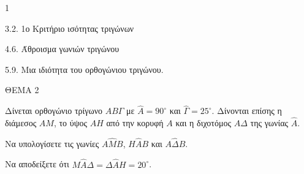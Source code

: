 \begin{ylh}{1}
    \item 3.2. 1ο Κριτήριο ισότητας τριγώνων
    \item 4.6. Άθροισμα γωνιών τριγώνου
    \item 5.9. Μια ιδιότητα του ορθογώνιου τριγώνου.
\end{ylh}

ΘΕΜΑ 2

Δίνεται ορθογώνιο τρίγωνο $AB\Gamma$ με $\widehat{A} = 90^{\circ}$ και $\widehat{\Gamma} = 25^{\circ}$. Δίνονται επίσης η διάμεσος $AM$, το ύψος $AH$ από την κορυφή $A$ και η διχοτόμος $A\Delta$ της γωνίας $\widehat{A}$.

\begin{alist}
\item Να υπολογίσετε τις γωνίες $A\widehat{M}B$, $H\widehat{A}B$ και $A\widehat{\Delta}B$. 
\item Να αποδείξετε ότι $M\widehat{A}\Delta = \Delta\widehat{A}H = 20^{\circ}$. 

\begin{center}
\end{center}
\end{alist}
